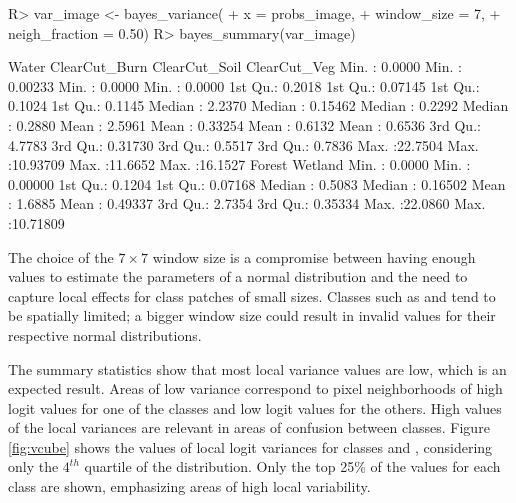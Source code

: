 \documentclass[
  shortnames]{jss}
\begin{document}
\begin{CodeChunk}
\begin{CodeInput}
R> var_image <- bayes_variance(
+     x = probs_image,
+     window_size = 7,
+     neigh_fraction = 0.50)
R> bayes_summary(var_image)
\end{CodeInput}
\begin{CodeOutput}
 Water             ClearCut_Burn      ClearCut_Soil     ClearCut_Veg     
 Min.   : 0.0000   Min.   : 0.00233   Min.   : 0.0000   Min.   : 0.0000  
 1st Qu.: 0.2018   1st Qu.: 0.07145   1st Qu.: 0.1024   1st Qu.: 0.1145  
 Median : 2.2370   Median : 0.15462   Median : 0.2292   Median : 0.2880  
 Mean   : 2.5961   Mean   : 0.33254   Mean   : 0.6132   Mean   : 0.6536  
 3rd Qu.: 4.7783   3rd Qu.: 0.31730   3rd Qu.: 0.5517   3rd Qu.: 0.7836  
 Max.   :22.7504   Max.   :10.93709   Max.   :11.6652   Max.   :16.1527  
 Forest            Wetland           
 Min.   : 0.0000   Min.   : 0.00000  
 1st Qu.: 0.1204   1st Qu.: 0.07168  
 Median : 0.5083   Median : 0.16502  
 Mean   : 1.6885   Mean   : 0.49337  
 3rd Qu.: 2.7354   3rd Qu.: 0.35334  
 Max.   :22.0860   Max.   :10.71809  
\end{CodeOutput}
\end{CodeChunk}

The choice of the \(7 \times 7\) window size is a compromise between having enough values to estimate the parameters of a normal distribution and the need to capture local effects for class patches of small sizes. Classes such as  and  tend to be spatially limited; a bigger window size could result in invalid values for their respective normal distributions.

The summary statistics show that most local variance values are low, which is an expected result. Areas of low variance correspond to pixel neighborhoods of high logit values for one of the classes and low logit values for the others. High values of the local variances are relevant in areas of confusion between classes. Figure \ref{fig:vcube} shows the values of local logit variances for classes  and , considering only the \(4^{th}\) quartile of the distribution. Only the top 25\% of the values for each class are shown, emphasizing areas of high local variability.
\end{document}

